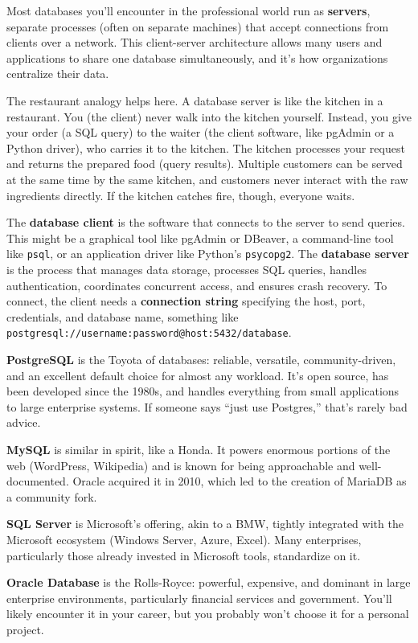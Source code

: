 \documentclass[
  letterpaper,
  DIV=11,
  numbers=noendperiod]{scrreprt}
\begin{document}
Most databases you'll encounter in the professional world run as
\textbf{servers}, separate processes (often on separate machines) that
accept connections from clients over a network. This client-server
architecture allows many users and applications to share one database
simultaneously, and it's how organizations centralize their data.

The restaurant analogy helps here. A database server is like the kitchen
in a restaurant. You (the client) never walk into the kitchen yourself.
Instead, you give your order (a SQL query) to the waiter (the client
software, like pgAdmin or a Python driver), who carries it to the
kitchen. The kitchen processes your request and returns the prepared
food (query results). Multiple customers can be served at the same time
by the same kitchen, and customers never interact with the raw
ingredients directly. If the kitchen catches fire, though, everyone
waits.

The \textbf{database client} is the software that connects to the server
to send queries. This might be a graphical tool like pgAdmin or DBeaver,
a command-line tool like \texttt{psql}, or an application driver like
Python's \texttt{psycopg2}. The \textbf{database server} is the process
that manages data storage, processes SQL queries, handles
authentication, coordinates concurrent access, and ensures crash
recovery. To connect, the client needs a \textbf{connection string}
specifying the host, port, credentials, and database name, something
like \texttt{postgresql://username:password@host:5432/database}.

\textbf{PostgreSQL} is the Toyota of databases: reliable, versatile,
community-driven, and an excellent default choice for almost any
workload. It's open source, has been developed since the 1980s, and
handles everything from small applications to large enterprise systems.
If someone says ``just use Postgres,'' that's rarely bad advice.

\textbf{MySQL} is similar in spirit, like a Honda. It powers enormous
portions of the web (WordPress, Wikipedia) and is known for being
approachable and well-documented. Oracle acquired it in 2010, which led
to the creation of MariaDB as a community fork.

\textbf{SQL Server} is Microsoft's offering, akin to a BMW, tightly
integrated with the Microsoft ecosystem (Windows Server, Azure, Excel).
Many enterprises, particularly those already invested in Microsoft
tools, standardize on it.

\textbf{Oracle Database} is the Rolls-Royce: powerful, expensive, and
dominant in large enterprise environments, particularly financial
services and government. You'll likely encounter it in your career, but
you probably won't choose it for a personal project.
\end{document}
